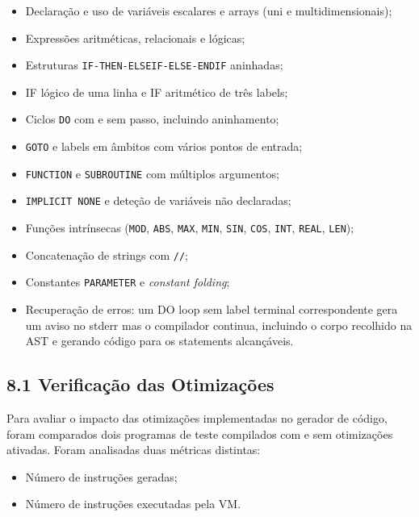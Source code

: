 \documentclass[a4paper]{article}
\begin{document}
\begin{itemize}
    \item Declaração e uso de variáveis escalares e arrays (uni e multidimensionais);
    \item Expressões aritméticas, relacionais e lógicas;
    \item Estruturas \texttt{IF-THEN-ELSEIF-ELSE-ENDIF} aninhadas;
    \item IF lógico de uma linha e IF aritmético de três labels;
    \item Ciclos \texttt{DO} com e sem passo, incluindo aninhamento;
    \item \texttt{GOTO} e labels em âmbitos com vários pontos de entrada;
    \item \texttt{FUNCTION} e \texttt{SUBROUTINE} com múltiplos argumentos;
    \item \texttt{IMPLICIT NONE} e deteção de variáveis não declaradas;
    \item Funções intrínsecas (\texttt{MOD}, \texttt{ABS}, \texttt{MAX}, \texttt{MIN}, \texttt{SIN}, \texttt{COS}, \texttt{INT}, \texttt{REAL}, \texttt{LEN});
    \item Concatenação de strings com \texttt{//};
    \item Constantes \texttt{PARAMETER} e \textit{constant folding};
    \item Recuperação de erros: um DO loop sem label terminal correspondente gera um aviso no stderr mas o compilador continua, incluindo o corpo recolhido na AST e gerando código para os statements alcançáveis.
\end{itemize}

\subsection*{8.1 Verificação das Otimizações}

\noindent Para avaliar o impacto das otimizações implementadas no gerador de código, foram comparados dois programas de teste compilados com e sem otimizações ativadas. Foram analisadas duas métricas distintas:

\begin{itemize}
    \item Número de instruções geradas;
    \item Número de instruções executadas pela VM.
\end{itemize}

\vspace{0.2cm}
\end{document}
